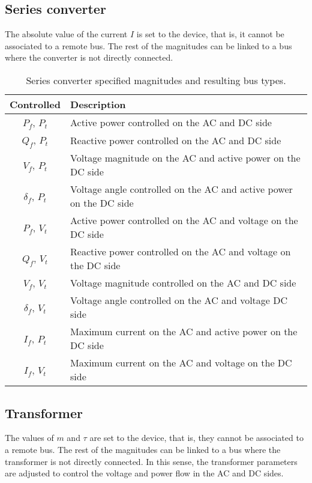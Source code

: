 \documentclass[11pt]{article}
\begin{document}
	\subsection{Series converter}
	The absolute value of the current $I$ is set to the device, that is, it cannot be associated to a remote bus. The rest of the magnitudes can be linked to a bus where the converter is not directly connected. 

	\begin{table}[!htb]\centering
		\caption{Series converter specified magnitudes and resulting bus types.}
			\begin{tabular}{cp{12cm}}
				\hline
				\textbf{Controlled} & \textbf{Description} \\
				\hline
				\hline
				$P_f$, $P_t$ & Active power controlled on the AC and DC side \\
				$Q_f$, $P_t$ & Reactive power controlled on the AC and DC side \\
				$V_f$, $P_t$ & Voltage magnitude on the AC and active power on the DC side \\
				$\delta_f$, $P_t$ & Voltage angle controlled on the AC and active power on the DC side \\
				$P_f$, $V_t$ & Active power controlled on the AC and voltage on the DC side \\
				$Q_f$, $V_t$ & Reactive power controlled on the AC and voltage on the DC side \\
				$V_f$, $V_t$ & Voltage magnitude controlled on the AC and DC side \\
				$\delta_f$, $V_t$ & Voltage angle controlled on the AC and voltage DC side \\
				$I_f$, $P_t$ & Maximum current on the AC and active power on the DC side \\
				$I_f$, $V_t$ & Maximum current on the AC and voltage on the DC side \\
				\hline
			\end{tabular}
	\end{table}

	\subsection{Transformer}
	The values of $m$ and $\tau$ are set to the device, that is, they cannot be associated to a remote bus. The rest of the magnitudes can be linked to a bus where the transformer is not directly connected. In this sense, the transformer parameters are adjusted to control the voltage and power flow in the AC and DC sides. 
\end{document}
